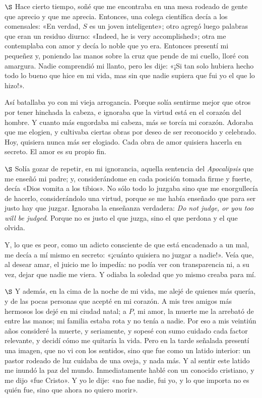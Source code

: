 \documentclass[a4paper, 12pt]{article}
\begin{document}
$\S$ Hace cierto tiempo, soñé que me encontraba en una mesa rodeado de gente que
aprecio y que me aprecia. Entonces, una colega científica decía a los
comensales: «En verdad, $S$ es un joven inteligente»; otro agregó luego
palabras que eran un residuo diurno: «Indeed, he is very accomplished»; otra me
contemplaba con amor y decía lo noble que yo era. Entonces presentí mi pequeñez
y, poniendo las manos sobre la cruz que pende de mi cuello, lloré con amargura.
Nadie comprendió mi llanto, pero les dije: «¡Si tan solo hubiera hecho todo lo
bueno que hice en mi vida, mas sin que nadie supiera que fui yo el que lo
hizo!».

Así batallaba yo con mi vieja arrogancia. Porque solía sentirme mejor que otros
por tener hinchada la cabeza, e ignoraba que la virtud está en el corazón del
hombre. Y cuanto más engordaba mi cabeza, más se torcía mi corazón. Adoraba que
me elogien, y cultivaba ciertas obras por deseo de ser reconocido y celebrado.
Hoy, quisiera nunca más ser elogiado. Cada obra de amor quisiera hacerla en
secreto. El amor es su propio fin.


$\S$ Solía gozar de repetir, en mi ignorancia, aquella sentencia del
\textit{Apocalipsis} que me enseñó mi padre; y, considerándome en cada posición
tomada firme y fuerte, decía «Dios vomita a los tibios». No sólo todo lo juzgaba
sino que me enorgullecía de hacerlo, considerándolo una virtud, porque se me
había enseñado que para ser justo hay que juzgar. Ignoraba la enseñanza
verdadera: \textit{Do not judge, or you too will be judged}. Porque no es justo
el que juzga, sino el que perdona y el que olvida. 

Y, lo que es peor, como un adicto consciente de que está encadenado a un mal, me
decía a mí mismo en secreto: «¡cuánto quisiera no juzgar a nadie!». Veía que, al
desear amar, el juicio me lo impedía: no podía ver con transparencia ni, a su
vez, dejar que nadie me viera. Y odiaba la soledad que yo mismo creaba para mí.

$\S$ Y además, en la cima de la noche de mi vida, me alejé de quienes más
quería, y de las pocas personas que acepté en mi corazón. A mis tres amigos más
hermosos los dejé en mi ciudad natal; a $P$, mi amor, la muerte me la arrebató
de entre las manos; mi familia estaba rota y no tenía a nadie. Por eso a mis
veintiún años consideré la muerte, y seriamente, y sopesé con sumo cuidado cada
factor relevante, y decidí cómo me quitaría la vida. Pero en la tarde señalada
presentí una imagen, que no vi con los sentidos, sino que fue como un latido
interior: un pastor rodeado de luz cuidaba de una oveja, y nada más. Y al sentir
este latido me inundó la paz del mundo. Inmediatamente hablé con un conocido
cristiano, y me dijo «fue Cristo». Y yo le dije: «no fue nadie, fui yo, y lo que
importa no es quién fue, sino que ahora no quiero morir». 
\end{document}

